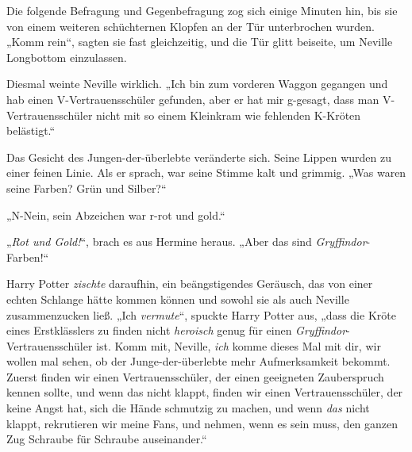 Die folgende Befragung und Gegenbefragung zog sich einige Minuten hin, bis sie von einem weiteren schüchternen Klopfen an der Tür unterbrochen wurden. „Komm rein“, sagten sie fast gleichzeitig, und die Tür glitt beiseite, um Neville Longbottom einzulassen.

Diesmal weinte Neville wirklich. „Ich bin zum vorderen Waggon gegangen und hab einen V-Vertrauensschüler gefunden, aber er hat mir g-gesagt, dass man V-Vertrauensschüler nicht mit so einem Kleinkram wie fehlenden K-Kröten belästigt.“

Das Gesicht des Jungen-der-überlebte veränderte sich. Seine Lippen wurden zu einer feinen Linie. Als er sprach, war seine Stimme kalt und grimmig. „Was waren seine Farben? Grün und Silber?“

„N-Nein, sein Abzeichen war r-rot und gold.“

„\emph{Rot und Gold!}“, brach es aus Hermine heraus. „Aber das sind \emph{Gryffindor}-Farben!“

Harry Potter \emph{zischte} daraufhin, ein beängstigendes Geräusch, das von einer echten Schlange hätte kommen können und sowohl sie als auch Neville zusammenzucken ließ. „Ich \emph{vermute}“, spuckte Harry Potter aus, „dass die Kröte eines Erstklässlers zu finden nicht \emph{heroisch} genug für einen \emph{Gryffindor}-Vertrauensschüler ist. Komm mit, Neville, \emph{ich} komme dieses Mal mit dir, wir wollen mal sehen, ob der Junge-der-überlebte mehr Aufmerksamkeit bekommt. Zuerst finden wir einen Vertrauensschüler, der einen geeigneten Zauberspruch kennen sollte, und wenn das nicht klappt, finden wir einen Vertrauensschüler, der keine Angst hat, sich die Hände schmutzig zu machen, und wenn \emph{das} nicht klappt, rekrutieren wir meine Fans, und nehmen, wenn es sein muss, den ganzen Zug Schraube für Schraube auseinander.“

